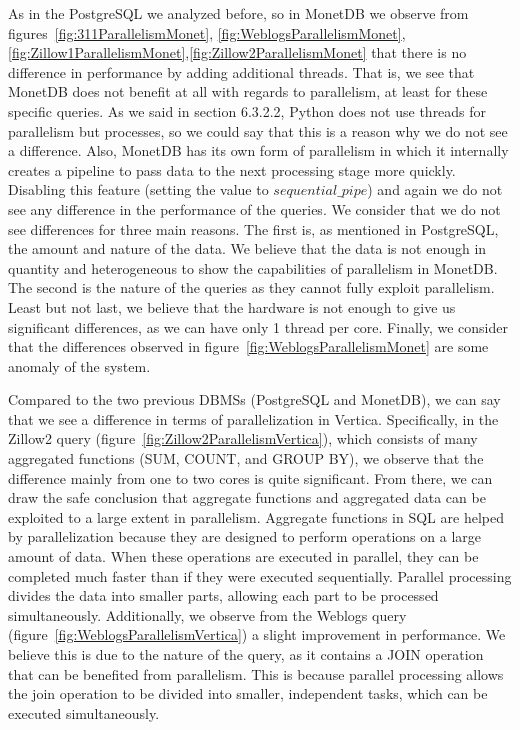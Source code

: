 As in the PostgreSQL we analyzed before, so in MonetDB we observe from figures~\ref{fig:311ParallelismMonet},
\ref{fig:WeblogsParallelismMonet},\ref{fig:Zillow1ParallelismMonet},\ref{fig:Zillow2ParallelismMonet} 
that there is no difference in performance by adding additional threads. That is, 
we see that MonetDB does not benefit at all with regards to parallelism, at least 
for these specific queries. As we said in section 6.3.2.2, Python does not use threads for 
parallelism but processes, so we could say that this is a reason why we do not see a difference. 
Also, MonetDB has its own form of parallelism in which it internally creates a pipeline to 
pass data to the next processing stage more quickly. Disabling this feature (setting the 
value to $sequential\_pipe$) and again we do not see any difference in the performance of 
the queries. We consider that we do not see differences for three main reasons. The first 
is, as mentioned in PostgreSQL, the amount and nature of the data. We believe that the data 
is not enough in quantity and heterogeneous to show the capabilities of parallelism in MonetDB. 
The second is the nature of the queries as they cannot fully exploit parallelism. Least but not 
last, we believe that the hardware is not enough to give us significant differences, as we can 
have only 1 thread per core. Finally, we consider that the differences observed in 
figure~\ref{fig:WeblogsParallelismMonet} are some anomaly of the system.

Compared to the two previous DBMSs (PostgreSQL and MonetDB), we can say that we see a 
difference in terms of parallelization in Vertica. Specifically, in the Zillow2 query 
(figure~\ref{fig:Zillow2ParallelismVertica}), which consists of many aggregated functions 
(SUM, COUNT, and GROUP BY), we observe that the difference mainly from one to two cores 
is quite significant. From there, we can draw the safe conclusion that aggregate functions 
and aggregated data can be exploited to a large extent in parallelism. Aggregate functions 
in SQL are helped by parallelization because they are designed to perform operations on a 
large amount of data. When these operations are executed in parallel, they can be completed 
much faster than if they were executed sequentially. Parallel processing divides the data into 
smaller parts, allowing each part to be processed simultaneously. Additionally, we observe 
from the Weblogs query (figure~\ref{fig:WeblogsParallelismVertica}) a slight improvement 
in performance. We believe this is due to the nature of the query, as it contains a JOIN 
operation that can be benefited from parallelism. This is because parallel processing 
allows the join operation to be divided into smaller, independent tasks, which can be 
executed simultaneously.

